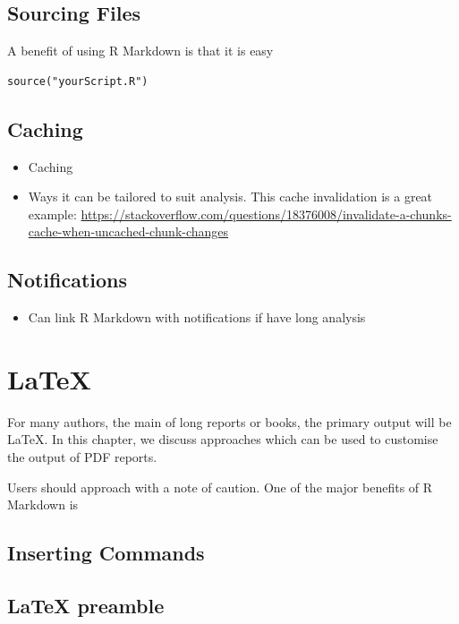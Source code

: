 \documentclass[]{book}
\providecommand{\tightlist}{%
  \setlength{\itemsep}{0pt}\setlength{\parskip}{0pt}}
\theoremstyle{definition}
\theoremstyle{definition}
\theoremstyle{definition}
\theoremstyle{remark}
\begin{document}
\section{Sourcing Files}\label{sourcing-files}

A benefit of using R Markdown is that it is easy

\begin{verbatim}
source("yourScript.R")
\end{verbatim}

\section{Caching}\label{caching}

\begin{itemize}
\tightlist
\item
  Caching
\item
  Ways it can be tailored to suit analysis. This cache invalidation is a
  great example:
  \url{https://stackoverflow.com/questions/18376008/invalidate-a-chunks-cache-when-uncached-chunk-changes}
\end{itemize}

\section{Notifications}\label{notifications}

\begin{itemize}
\tightlist
\item
  Can link R Markdown with notifications if have long analysis
\end{itemize}

\chapter{LaTeX}\label{latex}

For many authors, the main of long reports or books, the primary output
will be LaTeX. In this chapter, we discuss approaches which can be used
to customise the output of PDF reports.

Users should approach with a note of caution. One of the major benefits
of R Markdown is

\section{Inserting Commands}\label{inserting-commands}

\section{LaTeX preamble}\label{latex-preamble}
\end{document}
